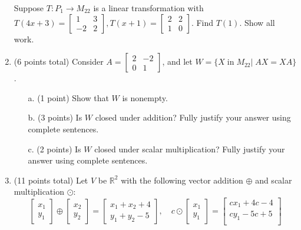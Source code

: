 \documentclass[12pt]{extarticle}
\begin{document}
\begin{enumerate}
Suppose $T:P_1\to M_{22}$ is a linear transformation with 
$T(4x+3)=\begin{bmatrix} 1 & 3 \\ -2 & 2\end{bmatrix}, T(x+1)=\begin{bmatrix} 2 & 2 \\ 1 & 0\end{bmatrix}$. Find $T(1)$. Show all work.

\newpage


\item (6 points total) Consider $A=\begin{bmatrix} 2 & -2 \\0 & 1\end{bmatrix}$, and let $W=\{ X \;\text{in}\; M_{22}|\; AX=XA\}$.

\begin{itemize}
    \item[a.] (1 point) Show that $W$ is nonempty.

    \vspace{1in}

    \item[b.] (3 points) Is $W$ closed under addition? Fully justify your answer using complete sentences.
\vfill

 \item[c.] (2 points) Is $W$ closed under scalar multiplication? Fully justify your answer using complete sentences.

\vfill    
\end{itemize}


       




    \newpage

    
    \item (11 points total) Let $V$ be $\mathbb{R}^2$ with the following vector addition $\oplus$ and scalar multiplication $\odot$:
    $$\begin{bmatrix} x_1 \\ y_1 \end{bmatrix}\oplus \begin{bmatrix} x_2 \\ y_2 \end{bmatrix}=\begin{bmatrix} x_1+x_2+4 \\ y_1+y_2-5 \end{bmatrix}, \quad c\odot\begin{bmatrix} x_1 \\ y_1 \end{bmatrix}=\begin{bmatrix} cx_1+4c-4 \\ cy_1-5c+5\\\end{bmatrix}$$


\end{enumerate}
\end{document}
